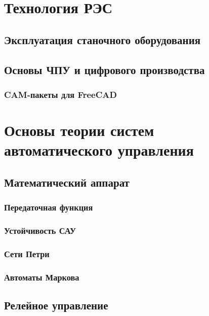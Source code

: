 \part{Технология РЭС}







\chapter{Эксплуатация станочного оборудования}

\chapter{Основы ЧПУ и цифрового производства}

\section{CAM-пакеты для FreeCAD}

\part{Основы теории систем автоматического управления}

\chapter{Математический аппарат}

\section{Передаточная функция}

\section{Устойчивость САУ}

\section{Сети Петри}

\section{Автоматы Маркова}

\chapter{Релейное управление}


